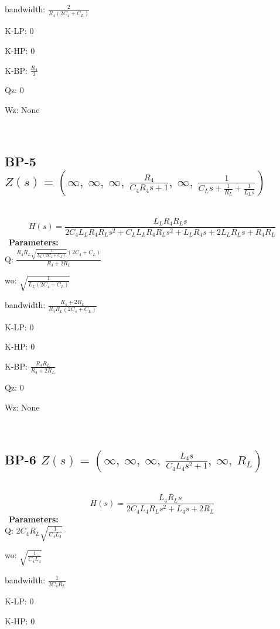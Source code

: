 \documentclass{article}
\begin{document}
bandwidth: $\frac{2}{R_{4} \left(2 C_{4} + C_{L}\right)}$\ 

K-LP: $0$\ 

K-HP: $0$\ 

K-BP: $\frac{R_{4}}{2}$\ 

Qz: $0$\ 

Wz: $\text{None}$\ 

\ 

\subsection{BP-5 $Z(s) = \left( \infty, \  \infty, \  \infty, \  \frac{R_{4}}{C_{4} R_{4} s + 1}, \  \infty, \  \frac{1}{C_{L} s + \frac{1}{R_{L}} + \frac{1}{L_{L} s}}\right)$ } \ 
\textbf{\[H(s) = \frac{L_{L} R_{4} R_{L} s}{2 C_{4} L_{L} R_{4} R_{L} s^{2} + C_{L} L_{L} R_{4} R_{L} s^{2} + L_{L} R_{4} s + 2 L_{L} R_{L} s + R_{4} R_{L}}\] } \ 
\textbf{Parameters:}\\ 

Q: $\frac{R_{4} R_{L} \sqrt{\frac{1}{L_{L} \left(2 C_{4} + C_{L}\right)}} \left(2 C_{4} + C_{L}\right)}{R_{4} + 2 R_{L}}$\ 

wo: $\sqrt{\frac{1}{L_{L} \left(2 C_{4} + C_{L}\right)}}$\ 

bandwidth: $\frac{R_{4} + 2 R_{L}}{R_{4} R_{L} \left(2 C_{4} + C_{L}\right)}$\ 

K-LP: $0$\ 

K-HP: $0$\ 

K-BP: $\frac{R_{4} R_{L}}{R_{4} + 2 R_{L}}$\ 

Qz: $0$\ 

Wz: $\text{None}$\ 

\ 

\subsection{BP-6 $Z(s) = \left( \infty, \  \infty, \  \infty, \  \frac{L_{4} s}{C_{4} L_{4} s^{2} + 1}, \  \infty, \  R_{L}\right)$ } \ 
\textbf{\[H(s) = \frac{L_{4} R_{L} s}{2 C_{4} L_{4} R_{L} s^{2} + L_{4} s + 2 R_{L}}\] } \ 
\textbf{Parameters:}\\ 

Q: $2 C_{4} R_{L} \sqrt{\frac{1}{C_{4} L_{4}}}$\ 

wo: $\sqrt{\frac{1}{C_{4} L_{4}}}$\ 

bandwidth: $\frac{1}{2 C_{4} R_{L}}$\ 

K-LP: $0$\ 

K-HP: $0$\ 
\end{document}
